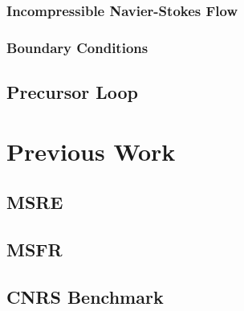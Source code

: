 \subsubsection{Incompressible Navier-Stokes Flow}

\subsubsection{Boundary Conditions}

\subsection{Precursor Loop}

\section{Previous Work} \label{sec:moltres-previous}

\subsection{MSRE}

\subsection{MSFR}

\subsection{CNRS Benchmark}

%



